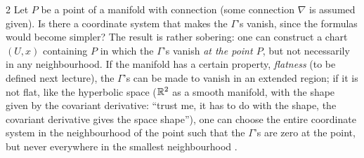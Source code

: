 \begin{paracol}{2}
Let $P$ be a point of a manifold with connection (some connection $\nabla$ is assumed given). Is there a coordinate system that makes the $\Gamma$'s vanish, since the formulas would become simpler? The result is rather sobering: one can construct a chart $(U,x)$ containing $P$ in which the $\Gamma$'s vanish \emph{at the point $P$}, but not necessarily in any neighbourhood. If the manifold has a certain property, \emph{flatness} (to be defined next lecture), the $\Gamma$'s can be made to vanish in an extended region; if it is not flat, like the hyperbolic space ($\mathbb{R}^2$ as a smooth manifold, with the shape given by the covariant derivative: ``trust me, it has to do with the shape, the covariant derivative gives the space shape''), one can choose the entire coordinate system in the neighbourhood of the point such that the $\Gamma$'s are zero at the point, but never everywhere in the smallest neighbourhood
.


\end{paracol}
